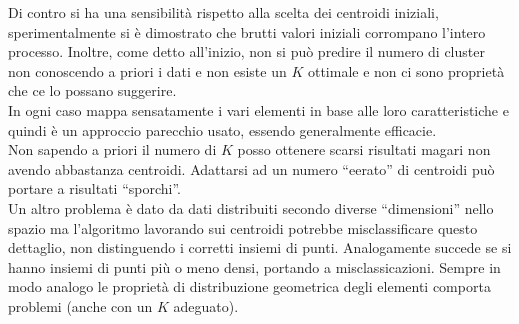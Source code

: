 \documentclass[a4paper,12pt, oneside]{book}
\begin{document}
Di contro si ha una sensibilità rispetto alla scelta dei centroidi
iniziali, sperimentalmente si è dimostrato che brutti valori iniziali corrompano
l'intero processo. Inoltre, come detto all'inizio, non si può predire il numero
di cluster non conoscendo a priori i dati e non esiste un $K$ ottimale e non ci
sono proprietà che ce lo possano suggerire. \\
In ogni caso mappa sensatamente i vari elementi in base alle loro
caratteristiche e quindi è un approccio parecchio usato, essendo generalmente
efficacie.\\
Non sapendo a priori il numero di $K$ posso ottenere scarsi risultati magari non
avendo abbastanza centroidi. Adattarsi ad un numero
``eerato'' di centroidi può portare a risultati ``sporchi''. \\
Un altro problema è dato da dati distribuiti secondo diverse ``dimensioni''
nello spazio ma l'algoritmo lavorando sui centroidi potrebbe misclassificare
questo dettaglio, non distinguendo i corretti insiemi di punti. Analogamente
succede se si hanno insiemi di punti più o meno densi, portando a
misclassicazioni. Sempre in modo analogo le proprietà di distribuzione
geometrica degli elementi comporta problemi (anche con un $K$ adeguato).
\end{document}
